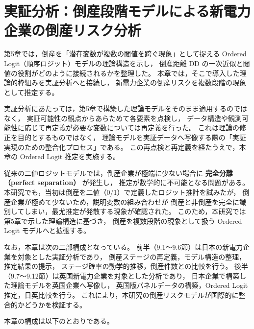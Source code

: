 \chapter{実証分析：倒産段階モデルによる新電力企業の倒産リスク分析}
\label{chap:ordered_logit_analysis}

第5章では，倒産を「潜在変数が複数の閾値を跨ぐ現象」として捉える
Ordered Logit（順序ロジット）モデルの理論構造を示し，
倒産距離 DD の一次近似と閾値の役割がどのように接続されるかを整理した。
本章では，そこで導入した理論的枠組みを実証分析へと接続し，
新電力企業の倒産リスクを複数段階の現象として推定する。

実証分析にあたっては，第5章で構築した理論モデルをそのまま適用するのではなく，
実証可能性の観点からあらためて各要素を点検し，
データ構造や観測可能性に応じて再定義が必要な変数については再定義を行った。
これは理論の修正を目的とするものではなく，
理論モデルを実証データへ写像する際の「実証実現のための整合化プロセス」である。
この再点検と再定義を経たうえで，本章の Ordered Logit 推定を実施する。

従来の二値ロジットモデルでは，倒産企業が極端に少ない場合に
\textbf{完全分離（perfect separation）} が発生し，
推定が数学的に不可能となる問題がある。
本研究でも，当初は倒産を二値（0/1）で定義したロジット推計を試みたが，
倒産企業が極めて少ないため，説明変数の組み合わせが
倒産と非倒産を完全に識別してしまい，最尤推定が発散する現象が確認された。
このため，本研究では第5章で示した理論構造に基づき，
倒産を複数段階の現象として扱う Ordered Logit モデルへと拡張する。

なお，本章は次の二部構成となっている。
前半（9.1～9.6節）は日本の新電力企業を対象とした実証分析であり，
倒産ステージの再定義，モデル構造の整理，推定結果の提示，
ステージ確率の動学的推移，倒産件数との比較を行う。
後半（9.7～9.12節）は英国新電力企業を対象とした分析であり，
日本企業で構築した理論モデルを英国企業へ写像し，
英国版パネルデータの構築，Ordered Logit 推定，日英比較を行う。
これにより，本研究の倒産リスクモデルが国際的に整合的かどうかを検証する。

本章の構成は以下のとおりである。

